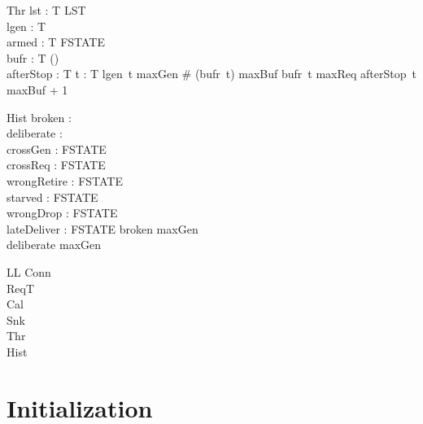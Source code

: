 \documentclass[a4paper,10pt,fleqn]{article}
\begin{document}
\begin{schema}{Thr}
  lst : T \fun LST \\
  lgen : T \fun \nat \\
  armed : T \fun FSTATE \\
  bufr : T \fun (\power \nat) \\
  afterStop : T \fun \nat
\where
  \forall t : T \spot lgen~t \leq maxGen \land \# (bufr~t) \leq maxBuf
    \land bufr~t  \upto maxReq \land afterStop~t \leq maxBuf + 1
\end{schema}

\begin{schema}{Hist}
  broken : \power \nat \\
  deliberate : \power \nat \\
  crossGen : FSTATE \\
  crossReq : FSTATE \\
  wrongRetire : FSTATE \\
  starved : FSTATE \\
  wrongDrop : FSTATE \\
  lateDeliver : FSTATE
\where
  broken  \upto maxGen \\
  deliberate  \upto maxGen
\end{schema}

\begin{schema}{LL}
  Conn \\
  ReqT \\
  Cal \\
  Snk \\
  Thr \\
  Hist
\end{schema}

\section{Initialization}
\end{document}
